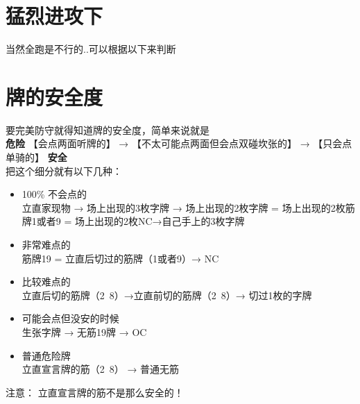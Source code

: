 \documentclass[小V的日麻笔记.tex]{subfiles}
\begin{document}
\section{猛烈进攻下}
当然全跑是不行的..可以根据以下来判断 \\

\section{牌的安全度}
要完美防守就得知道牌的安全度，简单来说就是 \\
\textbf{危险} 
【会点两面听牌的】 → 【不太可能点两面但会点双碰坎张的】 → 【只会点单骑的】 \textbf{安全}
\\
把这个细分就有以下几种：
\begin{itemize}
\item 100\% 不会点的 \\
立直家现物 → 场上出现的3枚字牌 → 场上出现的2枚字牌 = 场上出现的2枚筋牌1或者9 = 场上出现的2枚NC→自己手上的3枚字牌
\item 非常难点的 \\
筋牌19 = 立直后切过的筋牌（1或者9）→ NC
\item 比较难点的 \\
立直后切的筋牌（2~8）→立直前切的筋牌（2~8）→ 切过1枚的字牌
\item 可能会点但没安的时候 \\
生张字牌 → 无筋19牌 → OC
\item 普通危险牌 \\
立直宣言牌的筋（2~8） → 普通无筋
\end{itemize}

注意： 立直宣言牌的筋不是那么安全的！
\end{document}
